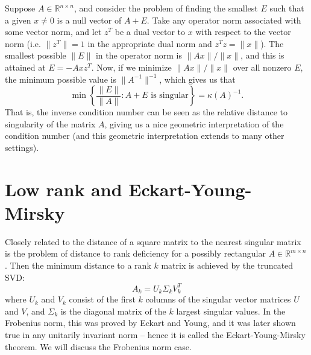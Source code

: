 \documentclass[12pt, leqno]{article} %
\begin{document}
Suppose $A \in \mathbb{R}^{n \times n}$, and consider the problem of
finding the smallest $E$ such that a given $x \neq 0$ is a null vector
of $A+E$.  Take any operator norm associated with some vector norm,
and let $z^T$ be a dual vector to $x$ with respect to the vector norm
(i.e. $\|z^T\| = 1$ in the appropriate dual norm and
$z^T z = \|x\|$).  The smallest possible $\|E\|$ in the operator
norm is $\|Ax\|/\|x\|$, and this is attained at $E = -Ax z^T$.  Now, 
if we minimize $\|Ax\|/\|x\|$ over all nonzero $E$, the minimum
possible value is $\|A^{-1}\|^{-1}$, which gives us that
\[
  \min\left\{ \frac{\|E\|}{\|A\|} : A+E \mbox{ is singular} \right\} = \kappa(A)^{-1}.
\]
That is, the inverse condition number can be seen as the relative
distance to singularity of the matrix $A$, giving us a nice geometric
interpretation of the condition number (and this geometric
interpretation extends to many other settings).

\section{Low rank and Eckart-Young-Mirsky}

Closely related to the distance of a square matrix to the nearest
singular matrix is the problem of distance to rank deficiency for a
possibly rectangular $A \in \mathbb{R}^{m \times n}$.  Then the
minimum distance to a rank $k$ matrix is achieved by the truncated
SVD:
\[
  A_k = U_k \Sigma_k V_k^T
\]
where $U_k$ and $V_k$ consist of the first $k$ columns of the singular
vector matrices $U$ and $V$, and $\Sigma_k$ is the diagonal matrix of
the $k$ largest singular values.  In the Frobenius norm, this was
proved by Eckart and Young, and it was later shown true in any
unitarily invariant norm -- hence it is called the Eckart-Young-Mirsky
theorem.  We will discuss the Frobenius norm case.
\end{document}
